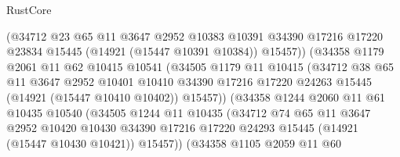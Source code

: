 \begin{lexlean}{RustCore}
\begin{coremodule}
                          (@34712
                            @23
                            @65
                            @11
                            @3647
                            @2952
                            @10383
                            @10391
                            @34390
                            @17216
                            @17220
                            @23834
                            @15445
                            (@14921 (@15447 @10391 @10384))
                            @15457))
                        (@34358
                          @1179
                          @2061
                          @11
                          @62
                          @10415
                          @10541
                          (@34505
                            @1179
                            @11
                            @10415
                            (@34712
                              @38
                              @65
                              @11
                              @3647
                              @2952
                              @10401
                              @10410
                              @34390
                              @17216
                              @17220
                              @24263
                              @15445
                              (@14921 (@15447 @10410 @10402))
                              @15457))
                          (@34358
                            @1244
                            @2060
                            @11
                            @61
                            @10435
                            @10540
                            (@34505
                              @1244
                              @11
                              @10435
                              (@34712
                                @74
                                @65
                                @11
                                @3647
                                @2952
                                @10420
                                @10430
                                @34390
                                @17216
                                @17220
                                @24293
                                @15445
                                (@14921 (@15447 @10430 @10421))
                                @15457))
                            (@34358
                              @1105
                              @2059
                              @11
                              @60

\end{coremodule}
\end{lexlean}
